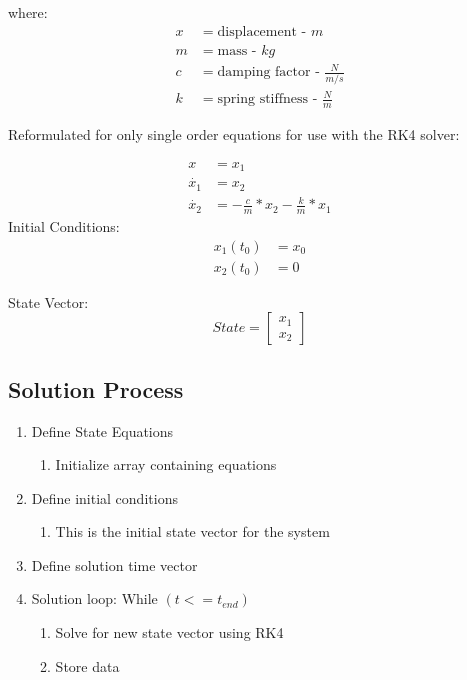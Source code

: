 \documentclass [a4paper, 12pt]{article}
\begin{document}
where:
\begin{align*}
	x &= \text{displacement - } m\\
	m &= \text{mass - } kg\\
	c &= \text{damping factor - } \frac{N}{m/s}\\
	k &= \text{spring stiffness - } \frac{N}{m}
\end{align*}

Reformulated for only single order equations for use with the RK4 solver:

\begin{align*}
	x &= x_1\\
	\dot{x_1} &= x_2\\
	\dot{x_2} &= -\frac{c}{m}*x_2 -\frac{k}{m} * x_1
\end{align*}
Initial Conditions:
\begin{align*}
	x_1(t_0) &= x_0\\
	x_2(t_0) &= 0
\end{align*}

State Vector:
\begin{equation*}
	State = \begin{bmatrix}
	x_1 \\
	x_2
	\end{bmatrix}
\end{equation*}

\subsection *{Solution Process}
\begin{enumerate}
	\item Define State Equations
	\begin{enumerate}
		\item Initialize array containing equations
	\end{enumerate}
	\item Define initial conditions
	\begin{enumerate}
		\item This is the initial state vector for the system
	\end{enumerate}
	\item Define solution time vector
	\item Solution loop: While $(t <= t_{end})$
	\begin{enumerate}
		\item Solve for new state vector using RK4
		\item Store data
	\end{enumerate}
	
\end{enumerate}
\end{document}
